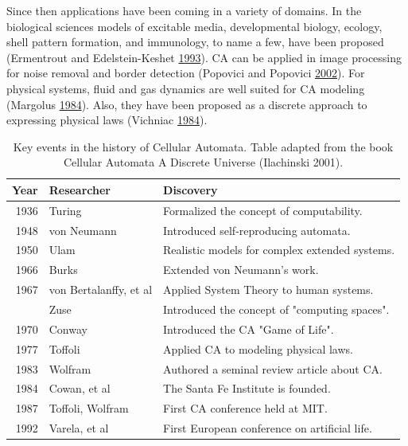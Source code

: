 \documentclass[
  12pt,
  openany]{book}
\begin{document}
Since then applications have been coming in a variety of domains. In the biological sciences models of excitable media, developmental biology, ecology, shell pattern formation, and immunology, to name a few, have been proposed (Ermentrout and Edelstein-Keshet \protect\hyperlink{ref-ermentrout1993cellular}{1993}). CA can be applied in image processing for noise removal and border detection (Popovici and Popovici \protect\hyperlink{ref-popovici2002cellular}{2002}). For physical systems, fluid and gas dynamics are well suited for CA modeling (Margolus \protect\hyperlink{ref-margolus1984physics}{1984}). Also, they have been proposed as a discrete approach to expressing physical laws (Vichniac \protect\hyperlink{ref-vichniac1984simulating}{1984}).

\begin{table}

\caption{\label{tab:key-events}Key events in the history of Cellular Automata. Table adapted from the book Cellular Automata A Discrete Universe (Ilachinski 2001).}
\centering
\begin{tabular}[t]{rll}
\toprule
Year & Researcher & Discovery\\
\midrule
\rowcolor{gray!6}  1936 & Turing & Formalized the concept of computability.\\
1948 & von Neumann & Introduced self-reproducing automata.\\
\rowcolor{gray!6}  1950 & Ulam & Realistic models for complex extended systems.\\
1966 & Burks & Extended von Neumann's work.\\
\rowcolor{gray!6}  1967 & von Bertalanffy, et al & Applied System Theory to human systems.\\
\addlinespace
1969 & Zuse & Introduced the concept of "computing spaces".\\
\rowcolor{gray!6}  1970 & Conway & Introduced the CA "Game of Life".\\
1977 & Toffoli & Applied CA to modeling physical laws.\\
\rowcolor{gray!6}  1983 & Wolfram & Authored a seminal review article about CA.\\
1984 & Cowan, et al & The Santa Fe Institute is founded.\\
\addlinespace
\rowcolor{gray!6}  1987 & Toffoli, Wolfram & First CA conference held at MIT.\\
1992 & Varela, et al & First European conference on artificial life.\\
\bottomrule
\end{tabular}
\end{table}
\end{document}
